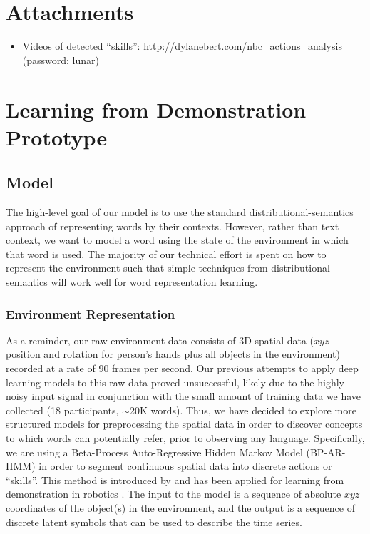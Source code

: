 \documentclass[11pt]{article}
\begin{document}
\section*{Attachments} 
\begin{itemize}
\item Videos of detected ``skills'': \url{http://dylanebert.com/nbc_actions_analysis} (password: lunar)
\end{itemize}

\newpage

\section{Learning from Demonstration Prototype} 
\label{sec:lfd}

\subsection{Model}

The high-level goal of our model is to use the standard distributional-semantics approach of representing words by their contexts. However, rather than text context, we want to model a word using the state of the environment in which that word is used. The majority of our technical effort is spent on how to represent the environment such that simple techniques from distributional semantics will work well for word representation learning. 

\subsubsection{Environment Representation}

As a reminder, our raw environment data consists of 3D spatial data ($xyz$ position and rotation for person's hands plus all objects in the environment) recorded at a rate of 90 frames per second. Our previous attempts to apply deep learning models to this raw data proved unsuccessful, likely due to the highly noisy input signal in conjunction with the small amount of training data we have collected (18 participants, $\sim$20K words). Thus, we have decided to explore more structured models for preprocessing the spatial data in order to discover concepts to which words can potentially refer, prior to observing any language. Specifically, we are using a Beta-Process Auto-Regressive Hidden Markov Model (BP-AR-HMM) in order to segment continuous spatial data into discrete actions or ``skills''. This method is introduced by \cite{emily} and has been applied for learning from demonstration in robotics \cite{george}. The input to the model is a sequence of absolute $xyz$ coordinates of the object(s) in the environment, and the output is a sequence of discrete latent symbols that can be used to describe the time series. 
\end{document}
